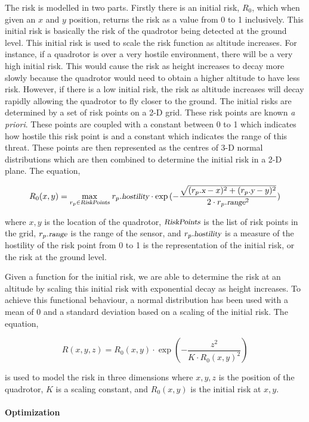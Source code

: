 \documentclass[12pt]{article}
\newcommand{\Var}[1]{\ensuremath{{\small{\textsl{#1}}}}}
\newcommand{\Max}[1]{\underset{#1}{\operatorname{max}}\;}
\begin{document}
The risk is modelled in two parts. Firstly there is an initial risk, $R_0$,
which when given an $x$ and $y$ position, returns the risk as a value from 0 to
1 inclusively. This initial risk is basically the risk of the quadrotor being
detected at the ground level. This initial risk is used to scale the risk
function as altitude increases. For instance, if a quadrotor is over a very
hostile environment, there will be a very high initial risk. This would cause
the risk as height increases to decay more slowly because the quadrotor would
need to obtain a higher altitude to have less risk. However, if there is a low
initial risk, the risk as altitude increases will decay rapidly allowing the
quadrotor to fly closer to the ground. The initial risks are determined by a
set of risk points on a 2-D grid. These risk points are known \emph{a priori}.
These points are coupled with a constant between 0 to 1 which indicates how
hostile this risk point is and a constant which indicates the range of this
threat. These points are then represented as the centres of 3-D normal
distributions which are then combined to determine the initial risk in a 2-D
plane. The equation,

$$ R_0(x, y) = \Max{r_p \in \Var{RiskPoints}} r_p.\Var{hostility} \cdot
\exp{(-\frac{\sqrt{(r_p.\Var{x} - x)^2 + (r_p.\Var{y} - y)^2}}{
2 \cdot r_p.\Var{range}^2})}$$

where $x, y$ is the location of the quadrotor, $\Var{RiskPoints}$ is the list
of risk points in the grid, $r_p.\Var{range}$ is the range of the sensor, and
$r_p.\Var{hostility}$ is a measure of the hostility of the risk point from 0 to
1 is the representation of the initial risk, or the risk at the ground level.

Given a function for the initial risk, we are able to determine the risk at an
altitude by scaling this initial risk with exponential decay as height
increases. To achieve this functional behaviour, a normal distribution has been
used with a mean of 0 and a standard deviation based on a scaling of the
initial risk. The equation,

$$ R(x, y, z) = R_0(x, y) \cdot \exp{(-\frac{z^2}{K \cdot R_0(x, y)^2})} $$

is used to model the risk in three dimensions where $x, y, z$ is the position
of the quadrotor, $K$ is a scaling constant, and $R_0(x, y)$ is the initial
risk at $x, y$.

\paragraph{Optimization}
\end{document}

